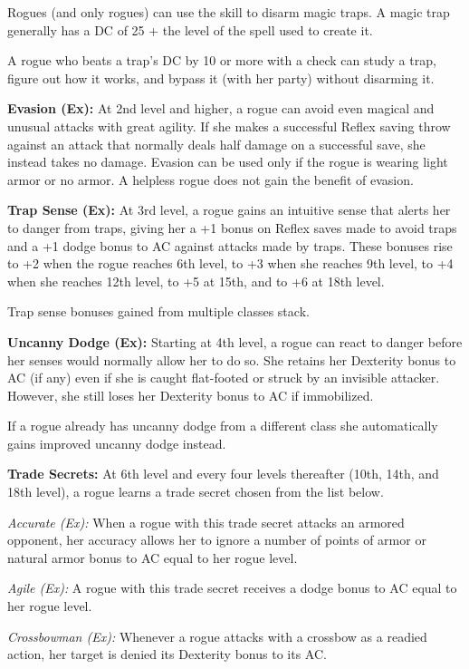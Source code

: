 Rogues (and only rogues) can use the  skill to disarm magic traps. A magic trap generally has a DC of 25 + the level of the spell used to create it.

A rogue who beats a trap's DC by 10 or more with a  check can study a trap, figure out how it works, and bypass it (with her party) without disarming it.

\textbf{Evasion (Ex):} At 2nd level and higher, a rogue can avoid even magical and unusual attacks with great agility. If she makes a successful Reflex saving throw against an attack that normally deals half damage on a successful save, she instead takes no damage. Evasion can be used only if the rogue is wearing light armor or no armor. A helpless rogue does not gain the benefit of evasion.

\textbf{Trap Sense (Ex):} At 3rd level, a rogue gains an intuitive sense that alerts her to danger from traps, giving her a +1 bonus on Reflex saves made to avoid traps and a +1 dodge bonus to AC against attacks made by traps. These bonuses rise to +2 when the rogue reaches 6th level, to +3 when she reaches 9th level, to +4 when she reaches 12th level, to +5 at 15th, and to +6 at 18th level.

Trap sense bonuses gained from multiple classes stack.

\textbf{Uncanny Dodge (Ex):} Starting at 4th level, a rogue can react to danger before her senses would normally allow her to do so. She retains her Dexterity bonus to AC (if any) even if she is caught flat-footed or struck by an invisible attacker. However, she still loses her Dexterity bonus to AC if immobilized.

If a rogue already has uncanny dodge from a different class she automatically gains improved uncanny dodge instead.

\textbf{Trade Secrets:} At 6th level and every four levels thereafter (10th, 14th, and 18th level), a rogue learns a trade secret chosen from the list below.

\textit{Accurate (Ex):} When a rogue with this trade secret attacks an armored opponent, her accuracy allows her to ignore a number of points of armor or natural armor bonus to AC equal to \onequarter her rogue level.

\textit{Agile (Ex):} A rogue with this trade secret receives a dodge bonus to AC equal to \onequarter her rogue level.

\textit{Crossbowman (Ex):} Whenever a rogue attacks with a crossbow as a readied action, her target is denied its Dexterity bonus to its AC.

